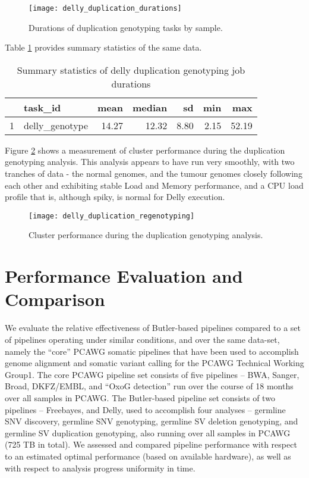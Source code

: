 \begin{figure}[H]
\texttt{[image: delly\_duplication\_durations]}
\centering
\caption {Durations of duplication genotyping tasks by sample.}
\label{fig:delly_duplication_durations}
\end{figure}

Table \ref{tab:delly_duplication_summary_stats} provides summary statistics of the same data.

\begin{table}[H]
\caption {Summary statistics of delly duplication genotyping job durations} \label{tab:delly_duplication_summary_stats}
\centering
\begin{tabular}{rlrrrrr}
  \hline
 & task\_id & mean & median & sd & min & max \\ 
  \hline
1 & delly\_genotype & 14.27 & 12.32 & 8.80 & 2.15 & 52.19 \\ 
   \hline
\end{tabular}
\end{table}

Figure \ref{fig:delly_duplication_regenotyping} shows a measurement of cluster performance during the duplication genotyping analysis. This analysis appears to have run very smoothly, with two tranches of data - the normal genomes, and the tumour genomes closely following each other and exhibiting stable Load and Memory performance, and a CPU load profile that is, although spiky, is normal for Delly execution.

\begin{figure}[h!]
\texttt{[image: delly\_duplication\_regenotyping]}
\centering
\caption {Cluster performance during the duplication genotyping analysis.}
\label{fig:delly_duplication_regenotyping}
\end{figure}

\section{Performance Evaluation and Comparison}

We evaluate the relative effectiveness of Butler-based pipelines compared to a set of pipelines operating under similar conditions, and over the same data-set, namely the “core” PCAWG somatic pipelines that have been used to accomplish genome alignment and somatic variant calling for the PCAWG Technical Working Group1. The core PCAWG pipeline set consists of five pipelines – BWA, Sanger, Broad, DKFZ/EMBL, and “OxoG detection” run over the course of 18 months over all samples in PCAWG. The Butler-based pipeline set consists of two pipelines – Freebayes, and Delly, used to accomplish four analyses – germline SNV discovery, germline SNV genotyping, germline SV deletion genotyping, and germline SV duplication genotyping, also running over all samples in PCAWG (725 TB in total). We assessed and compared pipeline performance with respect to an estimated optimal performance (based on available hardware), as well as with respect to analysis progress uniformity in time.

